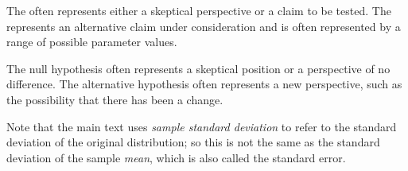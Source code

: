 


\begin{termBox}{
{\small The  often represents either a skeptical perspective or a claim to be tested. The  represents an alternative claim under consideration and is often represented by a range of possible parameter values.}}
\end{termBox}

The null hypothesis often represents a skeptical position or a perspective of no difference. The alternative hypothesis often represents a new perspective, such as the possibility that there has been a change. 


\label{utilizingOurCI}


Note that the main text uses \emph{sample standard deviation} to refer to the standard deviation of the original distribution; so this is not the same as the standard deviation of the sample \emph{mean}, which is also called the standard error.

